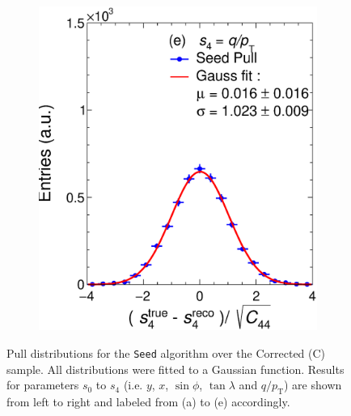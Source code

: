 \begin{figure}[t]
\begin{subfigure}{0.32\textwidth}
         \includegraphics[width=\textwidth]{figures/ch4-KF_NDGArLite/Toy/Corr/UnitSeed_p4.eps}
         \caption{}
         \label{fig:resp4Seed_GArLite_Corr}
     \end{subfigure}
        \caption[Pull distributions for the \texttt{Seed} algorithm over the Corrected (C) sample.]{Pull distributions for the \texttt{Seed} algorithm over the Corrected (C) sample. All distributions were fitted to a Gaussian function. Results for parameters $s_0$ to $s_4$ (i.e. $y$, $x$, $\sin\phi$, $\tan\lambda$ and $q/p_{\text{T}}$) are shown from left to right and labeled from (a) to (e) accordingly. }
        \label{fig:ToyUnitSeed_GArLite_Corr}
\end{figure}

